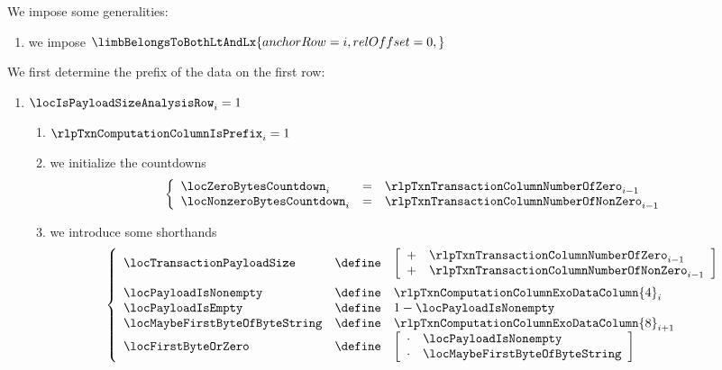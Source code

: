 We impose some generalities:
\begin{enumerate}
	\item we impose
		$\limbBelongsToBothLtAndLx {
			anchorRow = i ,
			relOffset = 0 ,
		}$
\end{enumerate}
We first determine the \rlp{} prefix of the data on the first row:
\begin{enumerate}[resume]
	\item \If $\locIsPayloadSizeAnalysisRow _{i} = 1$ \Then
		\begin{enumerate}
			\item $\rlpTxnComputationColumnIsPrefix _{i} = 1$
			\item we initialize the countdowns
				\[
					\left\{ \begin{array}{lcl}
						\locZeroBytesCountdown    _{i} & = & \rlpTxnTransactionColumnNumberOfZero    _{i - 1} \\
						\locNonzeroBytesCountdown _{i} & = & \rlpTxnTransactionColumnNumberOfNonZero _{i - 1} \\
					\end{array} \right.
				\]
			\item we introduce some shorthands
				\[
					\left\{ \begin{array}{lcl}
						\locTransactionPayloadSize & \define &
						\left[ \begin{array}{cl}
							+ & \rlpTxnTransactionColumnNumberOfZero    _{i - 1} \\
							+ & \rlpTxnTransactionColumnNumberOfNonZero _{i - 1} \\
						\end{array} \right]
						\vspace{2mm}
						\\
						\locPayloadIsNonempty          & \define & \rlpTxnComputationColumnExoDataColumn{4} _{i}      \\
						\locPayloadIsEmpty             & \define & 1 - \locPayloadIsNonempty   \\
						\locMaybeFirstByteOfByteString & \define & \rlpTxnComputationColumnExoDataColumn{8} _{i  + 1} \\
						\locFirstByteOrZero            & \define &
						\left[ \begin{array}{cl}
							\cdot & \locPayloadIsNonempty          \\
							\cdot & \locMaybeFirstByteOfByteString \\
						\end{array} \right]
					\end{array} \right.
\]
\end{enumerate}
\end{enumerate}
